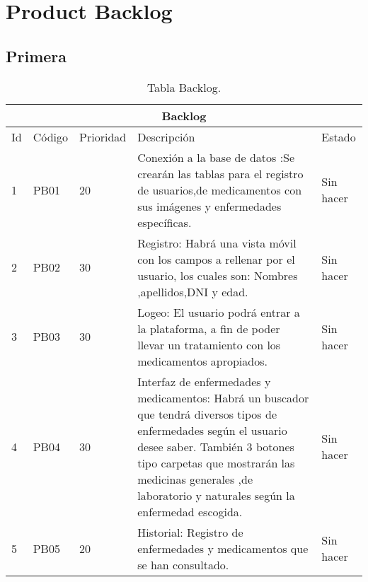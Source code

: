 \chapter{Product Backlog}

\section{Primera}

\begin{table}[htb]
	\centering
	\begin{tabular}{|l|p{2cm}|l|p{9cm}|l|}
		\hline
		\multicolumn{5}{|c|}{Backlog} \\ \hline
		Id & Código & Prioridad & Descripción & Estado \\
		\hline \hline
		1 & PB01 & 20 &  Conexión a la base de datos :Se crearán  las tablas para el registro de usuarios,de medicamentos con sus imágenes y enfermedades específicas. & Sin hacer \\ \hline
		2 & PB02 & 30 & Registro: Habrá una vista móvil con los campos a rellenar por el usuario, los cuales son: Nombres ,apellidos,DNI y edad. & Sin hacer \\ \hline
		3 & PB03 & 30 & Logeo: El usuario podrá entrar a la plataforma, a fin de poder llevar un tratamiento con los medicamentos apropiados. & Sin hacer \\ \hline
		
		4 & PB04 & 30 & Interfaz de enfermedades y medicamentos: Habrá un buscador que tendrá diversos tipos de enfermedades según el usuario desee saber. También 3 botones tipo carpetas que mostrarán las medicinas generales ,de laboratorio y naturales según la enfermedad escogida. & Sin hacer \\ \hline
		5 & PB05 & 20 & Historial: Registro de enfermedades y medicamentos que se han consultado. & Sin hacer \\ \hline
	\end{tabular}
	\caption{Tabla Backlog.}
	\label{tabla:Backlog}
\end{table}

